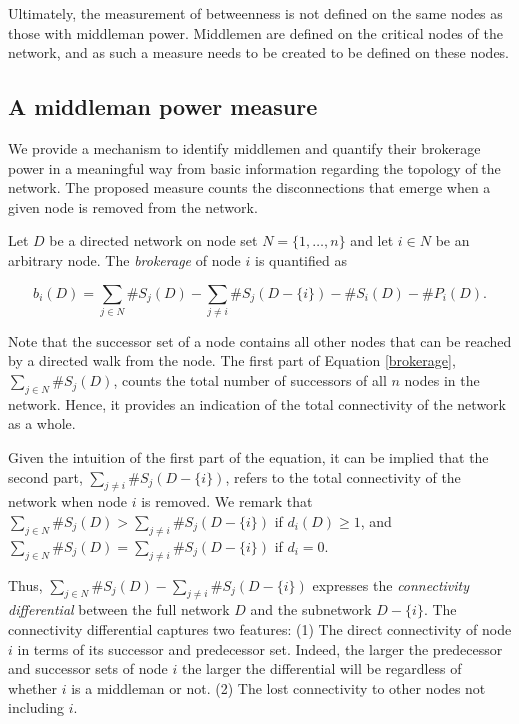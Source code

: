 Ultimately, the measurement of betweenness is not defined on the same nodes as those with middleman power. Middlemen are defined on the critical nodes of the network, and as such a measure needs to be created to be defined on these nodes.

\subsection{A middleman power measure}

We provide a mechanism to identify middlemen and quantify their brokerage power in a meaningful way from basic information regarding the topology of the network. The proposed measure counts the disconnections that emerge when a given node is removed from the network.

Let $D$ be a directed network on node set $N = \{1, \ldots ,n\}$ and let $i \in N$ be an arbitrary node. The \emph{brokerage} of node $i$ is quantified as

\begin{equation} \label{brokerage}
b_{i}(D) = \sum_{j \in N} \# S_{j}(D) - \sum_{j \neq i} \# S_{j}(D - \{i\}) - \#S_{i}(D) - \#P_{i}(D) .
\end{equation}

Note that the successor set of a node contains all other nodes that can be reached by a directed walk from the node. The first part of Equation \ref{brokerage}, $\sum_{j \in N} \# S_{j}(D)$, counts the total number of successors of all $n$ nodes in the network. Hence, it provides an indication of the total connectivity of the network as a whole.

Given the intuition of the first part of the equation, it can be implied that the second part, $\sum_{j \neq i} \# S_{j}(D - \{i\})$, refers to the total connectivity of the network when node $i$ is removed. We remark that $\sum_{j \in N} \# S_{j}(D) > \sum_{j \neq i} \# S_{j}(D - \{i\})$ if $d_{i}(D) \geqslant 1$, and $\sum_{j \in N} \# S_{j}(D) = \sum_{j \neq i} \# S_{j}(D - \{i\})$ if $d_{i} = 0$.

Thus, $\sum_{j \in N} \# S_{j}(D) - \sum_{j \neq i} \# S_{j}(D - \{i\})$ expresses the \emph{connectivity differential} between the full network $D$ and the subnetwork $D - \{i\}$. The connectivity differential captures two features: (1) The direct connectivity of node $i$ in terms of its successor and predecessor set. Indeed, the larger the predecessor and successor sets of node $i$ the larger the differential will be regardless of whether $i$ is a middleman or not. (2) The lost connectivity to other nodes not including $i$.

